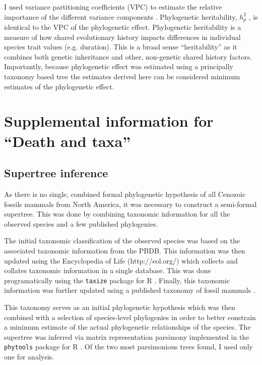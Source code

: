 I used variance partitioning coefficients (VPC) to estimate the relative importance of the different variance components \cite{Gelman2007}. Phylogenetic heritability, \(h_{p}^{2}\) \cite{Lynch1991,Housworth2004}, is identical to the VPC of the phylogenetic effect. Phylogenetic heritability is a measure of how shared evolutionary history impacts differences in individual species trait values (e.g. duration). This is a broad sense ``heritability'' as it combines both genetic inheritance and other, non-genetic shared history factors. Importantly, because phylogenetic effect was estimated using a principally taxonomy based tree the estimates derived here can be considered minimum estimates of the phylogenetic effect.




\section{Supplemental information for ``Death and taxa''}

\subsection{Supertree inference}
As there is no single, combined formal phylogenetic hypothesis of all Cenozoic fossils mammals from North America, it was necessary to construct a semi-formal supertree. This was done by combining taxonomic information for all the observed species and a few published phylogenies. 

The initial taxonomic classification of the observed species was based on the associated taxonomic information from the PBDB. This information was then updated using the Encyclopedia of Life (http://eol.org/) which collects and collates taxonomic information in a single database. This was done programatically using the \texttt{taxize} package for R \cite{2013taxize}. Finally, this taxonomic information was further updated using a published taxonomy of fossil mammals \cite{Janis1998,Janis2008}. 

This taxonomy serves as an initial phylogenetic hypothesis which was then combined with a selection of species-level phylogenies \cite{Bininda-Emonds2007,Raia2012f} in order to better constrain a minimum estimate of the actual phylogenetic relationships of the species. The supertree was inferred via matrix representation parsimony implemented in the \texttt{phytools} package for R \cite{revell2012phytools}. Of the two most parsimonious trees found, I used only one for analysis.

